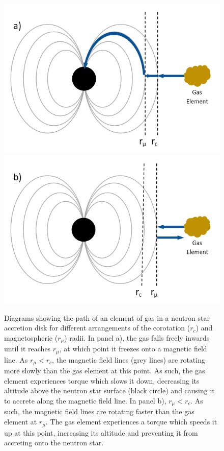 \begin{figure}
  \centering
  \includegraphics[width=0.7\linewidth, trim= 1mm 1mm 5mm 1mm, clip]{images/propeffd1.png}
  \includegraphics[width=0.7\linewidth, trim= 1mm 1mm 5mm 1mm, clip]{images/propeffd2.png}
  \caption[Diagrams showing the path of an element of gas in a neutron star accretion disk for different arrangements of the corotation and magnetospheric radii.]{Diagrams showing the path of an element of gas in a neutron star accretion disk for different arrangements of the corotation ($r_c$) and magnetospheric ($r_\mu$) radii.  In panel a), the gas falls freely inwards until it reaches $r_\mu$, at which point it freezes onto a magnetic field line.  As $r_\mu<r_c$, the magnetic field lines (grey lines) are rotating more slowly than the gas element at this point.  As such, the gas element experiences torque which slows it down, decreasing its altitude above the neutron star surface (black circle) and causing it to accrete along the magnetic field line.  In panel b), $r_\mu<r_c$.  As such, the magnetic field lines are rotating faster than the gas element at $r_\mu$.  The gas element experiences a torque which speeds it up at this point, increasing its altitude and preventing it from accreting onto the neutron star.}
  \label{fig:propdiag}
\end{figure}

